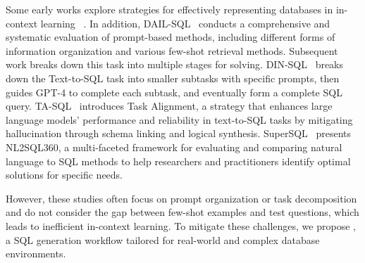 Some early works explore strategies for effectively representing databases in in-context learning
~\cite{rajkumar2022evaluating,chang2023prompt,tai2023exploring,tai2023exploring}. 
In addition, DAIL-SQL~\citep{gao2024text} conducts a comprehensive and systematic evaluation of prompt-based methods, including different forms of information organization and various few-shot retrieval methods.
Subsequent work breaks down this task into multiple stages for solving.
DIN-SQL~\citep{pourreza2024din} breaks down the Text-to-SQL task into smaller subtasks with specific prompts, then guides GPT-4 to complete each subtask, and eventually form a complete SQL query. 
TA-SQL~\citep{qu2024before} introduces Task Alignment, a strategy that enhances large language models' performance and reliability in text-to-SQL tasks by mitigating hallucination through schema linking and logical synthesis.
SuperSQL~\citep{li2024dawn} presents NL2SQL360, a multi-faceted framework for evaluating and comparing natural language to SQL methods to help researchers and practitioners identify optimal solutions for specific needs. 

However, these studies often focus on prompt organization or task decomposition and do not consider the gap between few-shot examples and test questions, which leads to inefficient in-context learning. 
To mitigate these challenges, we propose \model, a SQL generation workflow tailored for real-world and complex database environments.